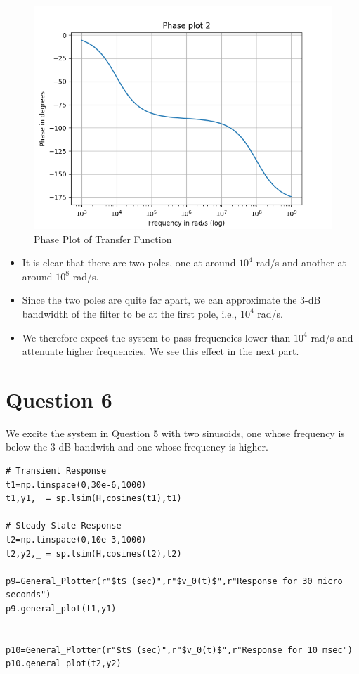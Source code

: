 \documentclass{article}
\begin{document}
\begin{figure}[h!]
    \centering
    \includegraphics[scale=0.6]{plots/Phase plot 2.png}
    \caption{Phase Plot of Transfer Function}
    \label{Phase Plot 2}
\end{figure}
\newpage    
\begin{itemize}
    \item
      It is clear that there are two poles, one at around \(10^4\) rad/s and
      another at around \(10^8\) rad/s.
    \item
      Since the two poles are quite far apart, we can approximate the 3-dB
      bandwidth of the filter to be at the first pole, i.e., \(10^4\) rad/s.
    \item
      We therefore expect the system to pass frequencies lower than \(10^4\)
      rad/s and attenuate higher frequencies. We see this effect in the next
      part.
\end{itemize}
\newpage
\section*{Question 6}\label{Question-6}

We excite the system in Question 5 with two sinusoids, one whose
frequency is below the 3-dB bandwith and one whose frequency is higher.
\\
\begin{lstlisting}
# Transient Response
t1=np.linspace(0,30e-6,1000)
t1,y1,_ = sp.lsim(H,cosines(t1),t1)

# Steady State Response
t2=np.linspace(0,10e-3,1000)
t2,y2,_ = sp.lsim(H,cosines(t2),t2)

p9=General_Plotter(r"$t$ (sec)",r"$v_0(t)$",r"Response for 30 micro seconds")
p9.general_plot(t1,y1)


p10=General_Plotter(r"$t$ (sec)",r"$v_0(t)$",r"Response for 10 msec")
p10.general_plot(t2,y2)
\end{lstlisting}
    
\end{document}
